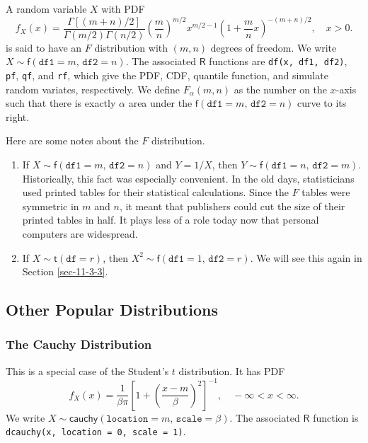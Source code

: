 \documentclass[captions=tableheading]{scrbook}
\begin{document}
A random variable \(X\) with PDF
\begin{equation}
f_{X}(x)=\frac{\Gamma[(m+n)/2]}{\Gamma(m/2)\Gamma(n/2)}\left(\frac{m}{n}\right)^{m/2}x^{m/2-1}\left(1+\frac{m}{n}x\right)^{-(m+n)/2},\quad x>0.
\end{equation}
is said to have an \(F\) distribution with \((m,n)\) degrees of freedom. We write \(X\sim\mathsf{f}(\mathtt{df1}=m,\,\mathtt{df2}=n)\). The associated \(\mathsf{R}\) functions are \texttt{df(x, df1, df2)}, \texttt{pf}, \texttt{qf}, and \texttt{rf}, which give the PDF, CDF, quantile function, and simulate random variates, respectively. We define \(F_{\alpha}(m,n)\) as the number on the \(x\)-axis such that there is exactly \(\alpha\) area under the \(\mathsf{f}(\mathtt{df1}=m,\,\mathtt{df2}=n)\) curve to its right. 

\begin{rem}
Here are some notes about the \(F\) distribution.
\begin{enumerate}
\item If \(X\sim\mathsf{f}(\mathtt{df1}=m,\,\mathtt{df2}=n)\) and \(Y=1/X\), then \(Y\sim\mathsf{f}(\mathtt{df1}=n,\,\mathtt{df2}=m)\). Historically, this fact was especially convenient. In the old days, statisticians used printed tables for their statistical calculations. Since the \(F\) tables were symmetric in \(m\) and \(n\), it meant that publishers could cut the size of their printed tables in half. It plays less of a role today now that personal computers are widespread.
\item If \(X\sim\mathsf{t}(\mathtt{df}=r)\), then \(X^{2}\sim\mathsf{f}(\mathtt{df1}=1,\,\mathtt{df2}=r)\). We will see this again in Section \ref{sec-11-3-3}.
\end{enumerate}

\end{rem}
\subsection{Other Popular Distributions}
\label{sec-6-5-3}
\label{sub-Other-Popular-Distributions}
\subsubsection{The Cauchy Distribution}
\label{sec-6-5-3-1}
\label{sub-The-Cauchy-Distribution}


This is a special case of the Student's \(t\) distribution. It has PDF
\begin{equation}
f_{X}(x)=\frac{1}{\beta\pi}\left[1+\left(\frac{x-m}{\beta}\right)^{2}\right]^{-1},\quad-\infty<x<\infty.
\end{equation}
We write \(X\sim\mathsf{cauchy}(\mathtt{location}=m,\,\mathtt{scale}=\beta)\). The associated \(\mathsf{R}\) function is \texttt{dcauchy(x, location = 0, scale = 1)}.
\end{document}
